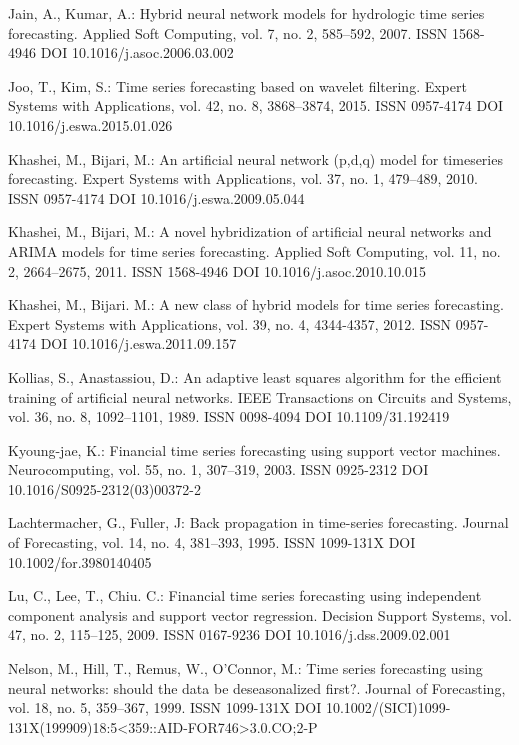 \begin{thebibliography}{99.}
 Jain, A., Kumar, A.: Hybrid neural network models for hydrologic time series forecasting. Applied Soft Computing, vol. 7, no. 2, 585--592, 2007. ISSN 1568-4946 DOI 10.1016/j.asoc.2006.03.002

 Joo, T., Kim, S.: Time series forecasting based on wavelet filtering. Expert Systems with Applications, vol. 42, no. 8, 3868--3874, 2015. ISSN 0957-4174 DOI 10.1016/j.eswa.2015.01.026

 Khashei, M., Bijari, M.: An artificial neural network (p,d,q) model for timeseries forecasting. Expert Systems with Applications, vol. 37, no. 1, 479--489, 2010. ISSN 0957-4174 DOI 10.1016/j.eswa.2009.05.044

 Khashei, M., Bijari, M.: A novel hybridization of artificial neural networks and ARIMA models for time series forecasting. Applied Soft Computing, vol. 11, no. 2, 2664--2675, 2011. ISSN 1568-4946 DOI 10.1016/j.asoc.2010.10.015

 Khashei, M., Bijari. M.: A new class of hybrid models for time series forecasting. Expert Systems with Applications, vol. 39, no. 4, 4344-4357, 2012. ISSN 0957-4174 DOI 10.1016/j.eswa.2011.09.157

 Kollias, S., Anastassiou, D.: An adaptive least squares algorithm for the efficient training of artificial neural networks. IEEE Transactions on Circuits and Systems, vol. 36, no. 8, 1092--1101, 1989. ISSN 0098-4094 DOI 10.1109/31.192419

 Kyoung-jae, K.: Financial time series forecasting using support vector machines. Neurocomputing, vol. 55, no. 1, 307--319, 2003. ISSN 0925-2312 DOI 10.1016/S0925-2312(03)00372-2

 Lachtermacher, G., Fuller, J: Back propagation in time-series forecasting. Journal of Forecasting, vol. 14, no. 4, 381--393, 1995. ISSN 1099-131X DOI 10.1002/for.3980140405

 Lu, C., Lee, T., Chiu. C.: Financial time series forecasting using independent component analysis and support vector regression. Decision Support Systems, vol. 47, no. 2, 115--125, 2009. ISSN 0167-9236 DOI 10.1016/j.dss.2009.02.001

 Nelson, M., Hill, T., Remus, W., O'Connor, M.: Time series forecasting using neural networks: should the data be deseasonalized first?. Journal of Forecasting, vol. 18, no. 5, 359--367, 1999. ISSN 1099-131X DOI 10.1002/(SICI)1099-131X(199909)18:5<359::AID-FOR746>3.0.CO;2-P


\end{thebibliography}
